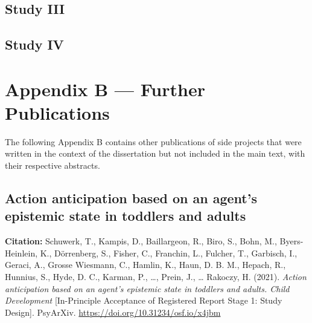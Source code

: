 \documentclass[
]{scrbook}
\begin{document}
\section*{Study III}\label{studyIII}

\begin{minipage}{\textwidth}

\end{minipage}



\newpage

\section*{Study IV}\label{studyIV}

\begin{minipage}{\textwidth}

\end{minipage}



\chapter*{Appendix B --- Further Publications}\label{appendixB}

The following Appendix B contains other publications of side projects that were written in the context of the dissertation but not included in the main text, with their respective abstracts.

\section*{Action anticipation based on an agent's epistemic state in toddlers and adults}\label{manybabies}

\textbf{Citation:} Schuwerk, T., Kampis, D., Baillargeon, R., Biro, S., Bohn, M., Byers-Heinlein, K., Dörrenberg, S., Fisher, C., Franchin, L., Fulcher, T., Garbisch, I., Geraci, A., Grosse Wiesmann, C., Hamlin, K., Haun, D. B. M., Hepach, R., Hunnius, S., Hyde, D. C., Karman, P., \ldots, Prein, J., \ldots{} Rakoczy, H. (2021). \emph{Action anticipation based on an agent's epistemic state in toddlers and adults. Child Development} {[}In-Principle Acceptance of Registered Report Stage 1: Study Design{]}. PsyArXiv. \mbox{\url{https://doi.org/10.31234/osf.io/x4jbm}}
\end{document}
